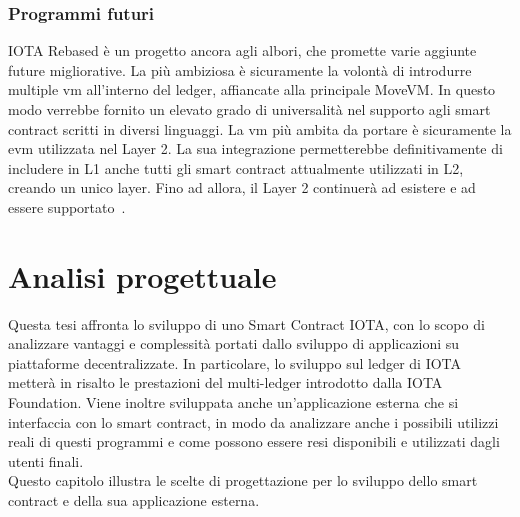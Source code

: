 \documentclass[12pt,a4paper,openright,twoside]{report}
\begin{document}
\subsection{Programmi futuri}
IOTA Rebased è un progetto ancora agli albori, che promette varie aggiunte future migliorative. La più ambiziosa è sicuramente la volontà di introdurre multiple \acrshort{vm} all'interno del ledger, affiancate alla principale MoveVM. In questo modo verrebbe fornito un elevato grado di universalità nel supporto agli smart contract scritti in diversi linguaggi. La \acrlong{vm} più ambita da portare è sicuramente la \acrshort{evm} utilizzata nel Layer 2. La sua integrazione permetterebbe definitivamente di includere in L1 anche tutti gli smart contract attualmente utilizzati in L2, creando un unico layer. Fino ad allora, il Layer 2 continuerà ad esistere e ad essere supportato~\cite{iotarebased}.

\clearpage{\pagestyle{empty}\cleardoublepage}



\chapter{Analisi progettuale}
\label{chap:projectanalysis}
Questa tesi affronta lo sviluppo di uno Smart Contract IOTA, con lo scopo di analizzare vantaggi e complessità portati dallo sviluppo di applicazioni su piattaforme decentralizzate. In particolare, lo sviluppo sul ledger di IOTA metterà in risalto le prestazioni del multi-ledger introdotto dalla IOTA Foundation. Viene inoltre sviluppata anche un'applicazione esterna che si interfaccia con lo smart contract, in modo da analizzare anche i possibili utilizzi reali di questi programmi e come possono essere resi disponibili e utilizzati dagli utenti finali. \\
Questo capitolo illustra le scelte di progettazione per lo sviluppo dello smart contract e della sua applicazione esterna.
\end{document}
